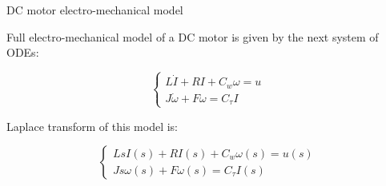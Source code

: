 \documentclass{beamer}
\begin{document}
\begin{frame}{DC motor electro-mechanical model}
	\begin{flushleft}
		
		Full electro-mechanical model of a DC motor is given by the next system of ODEs:
		
		\begin{equation}
			\begin{cases}
				L \dot I + RI + C_w \omega = u \\
				J \dot \omega + F \omega = C_\tau I
			\end{cases}
		\end{equation}
		
		Laplace transform of this model is:
		
		\begin{equation}
			\begin{cases}
				Ls I(s) + RI(s) + C_w \omega(s) = u(s) \\
				Js \omega(s) + F \omega(s) = C_\tau I(s)
			\end{cases}
		\end{equation}
		
		
	\end{flushleft}
\end{frame}
\end{document}
